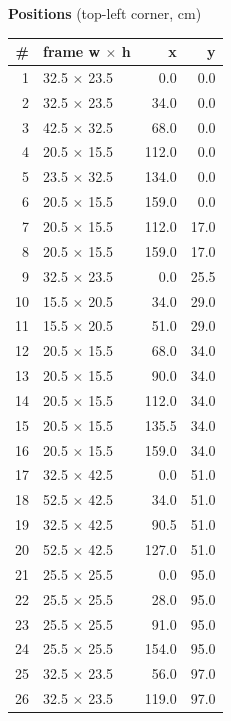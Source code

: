 \documentclass[a4paper,landscape,10pt]{article}
\begin{document}
\begin{minipage}[t]{0.25\textwidth}
\vspace{8pt}
{\bfseries Positions} (top-left corner, cm)\\[2pt]
\tiny
\begin{tabular}{@{}r l r r@{}}
\toprule
\# & frame w $\times$ h & x & y \\
\midrule
1 & 32.5 $\times$ 23.5 & 0.0 & 0.0 \\
2 & 32.5 $\times$ 23.5 & 34.0 & 0.0 \\
3 & 42.5 $\times$ 32.5 & 68.0 & 0.0 \\
4 & 20.5 $\times$ 15.5 & 112.0 & 0.0 \\
5 & 23.5 $\times$ 32.5 & 134.0 & 0.0 \\
6 & 20.5 $\times$ 15.5 & 159.0 & 0.0 \\
7 & 20.5 $\times$ 15.5 & 112.0 & 17.0 \\
8 & 20.5 $\times$ 15.5 & 159.0 & 17.0 \\
9 & 32.5 $\times$ 23.5 & 0.0 & 25.5 \\
10 & 15.5 $\times$ 20.5 & 34.0 & 29.0 \\
11 & 15.5 $\times$ 20.5 & 51.0 & 29.0 \\
12 & 20.5 $\times$ 15.5 & 68.0 & 34.0 \\
13 & 20.5 $\times$ 15.5 & 90.0 & 34.0 \\
14 & 20.5 $\times$ 15.5 & 112.0 & 34.0 \\
15 & 20.5 $\times$ 15.5 & 135.5 & 34.0 \\
16 & 20.5 $\times$ 15.5 & 159.0 & 34.0 \\
17 & 32.5 $\times$ 42.5 & 0.0 & 51.0 \\
18 & 52.5 $\times$ 42.5 & 34.0 & 51.0 \\
19 & 32.5 $\times$ 42.5 & 90.5 & 51.0 \\
20 & 52.5 $\times$ 42.5 & 127.0 & 51.0 \\
21 & 25.5 $\times$ 25.5 & 0.0 & 95.0 \\
22 & 25.5 $\times$ 25.5 & 28.0 & 95.0 \\
23 & 25.5 $\times$ 25.5 & 91.0 & 95.0 \\
24 & 25.5 $\times$ 25.5 & 154.0 & 95.0 \\
25 & 32.5 $\times$ 23.5 & 56.0 & 97.0 \\
26 & 32.5 $\times$ 23.5 & 119.0 & 97.0 \\
\bottomrule
\end{tabular}
\end{minipage}
\clearpage
\end{document}

